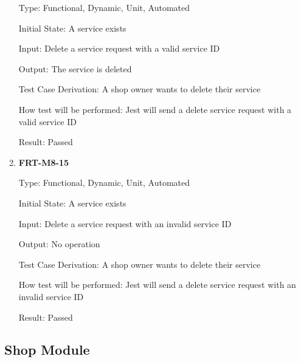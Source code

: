 \documentclass[12pt, titlepage]{article}
\begin{document}
\begin{enumerate}
	      Type: Functional, Dynamic, Unit, Automated

	      Initial State: A service exists

	      Input: Delete a service request with a valid service ID

	      Output: The service is deleted

	      Test Case Derivation: A shop owner wants to delete their service

	      How test will be performed: Jest will send a delete service request with a valid service ID

	      Result: Passed

	\item \textbf{FRT-M8-15}

	      Type: Functional, Dynamic, Unit, Automated

	      Initial State: A service exists

	      Input: Delete a service request with an invalid service ID

	      Output: No operation

	      Test Case Derivation: A shop owner wants to delete their service

	      How test will be performed: Jest will send a delete service request with an invalid service ID

	      Result: Passed

\end{enumerate}

\subsection{Shop Module}
\end{document}
